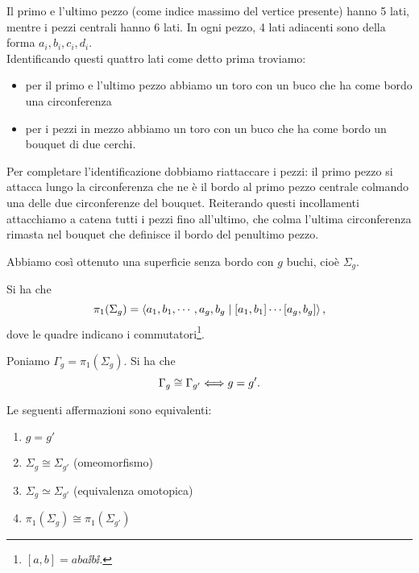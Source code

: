 \begin{multicols*}{2}
Il primo e l'ultimo pezzo (come indice massimo del vertice presente) hanno 5 lati, mentre i pezzi centrali hanno 6 lati. In ogni pezzo, 4 lati adiacenti sono della forma $a_i, b_i, c_i, d_i$.\\
Identificando questi quattro lati come detto prima troviamo:
\begin{itemize}[noitemsep]
\item per il primo e l'ultimo pezzo abbiamo un toro con un buco che ha come bordo una circonferenza
\item per i pezzi in mezzo abbiamo un toro con un buco che ha come bordo un bouquet di due cerchi.
\end{itemize}
Per completare l'identificazione dobbiamo riattaccare i pezzi: il primo pezzo si attacca lungo la circonferenza che ne \`e il bordo al primo pezzo centrale colmando una delle due circonferenze del bouquet. Reiterando questi incollamenti attacchiamo a catena tutti i pezzi fino all'ultimo, che colma l'ultima circonferenza rimasta nel bouquet che definisce il bordo del penultimo pezzo.

Abbiamo cos\`i ottenuto una superficie senza bordo con $g$ buchi, cio\`e $\Sigma_g$.

\begin{theorem}\label{GruppoFondamentaleSuperficiDiGenereg}
Si ha che
\[\pi_1(\Sigma_g)=\left\langle a_1,b_1,\cdots, a_g,b_g\mid \left[a_1,b_1\right]\cdots\left[a_g,b_g\right]\right\rangle,\] dove le quadre indicano i commutatori\footnote{$[a,b]=aba\ii b\ii$.}.
\end{theorem}


\begin{proposition}\label{RangoDeterminaGruppoFondamentaleDisuperficieConGenereg}
Poniamo $\Gamma_g=\pi_1(\Sigma_g)$. Si ha che
\[\Gamma_g\cong \Gamma_{g'}\Longleftrightarrow g=g'.\]
\end{proposition}

\begin{theorem}\label{GenereClassiOmotopiaEGruppoFondamentaleSonoInvariantiCompletiPerSuperficiCompatte}
Le seguenti affermazioni sono equivalenti:
\begin{enumerate}[noitemsep]
\item $g=g'$
\item $\Sigma_g\cong \Sigma_{g'}$ (omeomorfismo)
\item $\Sigma_g\simeq \Sigma_{g'}$ (equivalenza omotopica)
\item $\pi_1(\Sigma_g)\cong \pi_1(\Sigma_{g'})$
\end{enumerate}
\end{theorem}


\end{multicols*}
